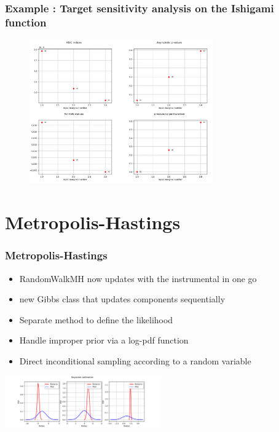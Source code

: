 \documentclass[aspectratio=169]{beamer}
\begin{document}
\begin{frame}
\frametitle{Example : Target sensitivity analysis on the Ishigami function}
\begin{figure}
   \includegraphics[width=0.7\textwidth]{figures/HSIC2.png}
\end{figure}
\end{frame}

\section{Metropolis-Hastings}
% 
\begin{frame}[containsverbatim]
\frametitle{Metropolis-Hastings}

\begin{itemize}
\item RandomWalkMH now updates with the instrumental in one go
\item new Gibbs class that updates components sequentially
\item Separate method to define the likelihood
\item Handle improper prior via a log-pdf function
\item Direct inconditional sampling according to a random variable
\end{itemize}

 
\begin{center}
\includegraphics[width=0.5\textwidth]{figures/sphx_glr_plot_bayesian_calibration_002.png}
\end{center}
\end{frame}
\end{document}
